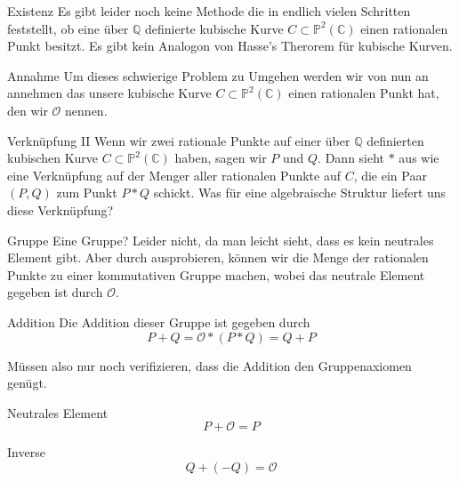 \documentclass{beamer}
\begin{document}
\begin{frame}{Existenz}
    Es gibt leider noch keine Methode die in endlich vielen Schritten feststellt, ob eine über \(\mathbb{Q}\) definierte kubische Kurve \(C\subset\mathbb{P}^{2}(\mathbb{C})\) einen rationalen Punkt besitzt. Es gibt kein Analogon von Hasse's Therorem für kubische Kurven.
\end{frame}

\begin{frame}{Annahme}
    Um dieses schwierige Problem zu Umgehen werden wir von nun an annehmen das unsere kubische Kurve \(C\subset\mathbb{P}^{2}(\mathbb{C})\) einen rationalen Punkt hat, den wir \(\mathcal{O}\) nennen.
\end{frame}

\begin{frame}{Verknüpfung II}
   Wenn wir zwei rationale Punkte auf einer über \(\mathbb{Q}\) definierten kubischen Kurve \(C\subset\mathbb{P}^{2}(\mathbb{C})\) haben, sagen wir \(P\) und \(Q\). Dann sieht \(\ast\) aus wie eine Verknüpfung auf der Menger aller rationalen Punkte auf \(C\), die ein Paar \((P,Q)\) zum Punkt \(P\ast Q\) schickt. Was für eine algebraische Struktur liefert uns diese Verknüpfung?
\end{frame}

\begin{frame}{Gruppe}
    Eine Gruppe? Leider nicht, da man leicht sieht, dass es kein neutrales Element gibt.\newline
    Aber durch ausprobieren, können wir die Menge der rationalen Punkte zu einer kommutativen Gruppe machen, wobei das neutrale Element gegeben ist durch \(\mathcal{O}\).
\end{frame}

\begin{frame}{Addition}
Die Addition dieser Gruppe ist gegeben durch
\[P+Q=\mathcal{O}\ast(P\ast Q)=Q+P\]
\begin{center}
\end{center}
Müssen also nur noch verifizieren, dass die Addition den Gruppenaxiomen genügt.
\end{frame}

\begin{frame}{Neutrales Element}
\[P+\mathcal{O}=P\]
\begin{center}
\end{center}
\end{frame}

\begin{frame}{Inverse}
\[Q+(-Q)=\mathcal{O}\]
\begin{center}
\end{center}
\end{frame}
\end{document}
